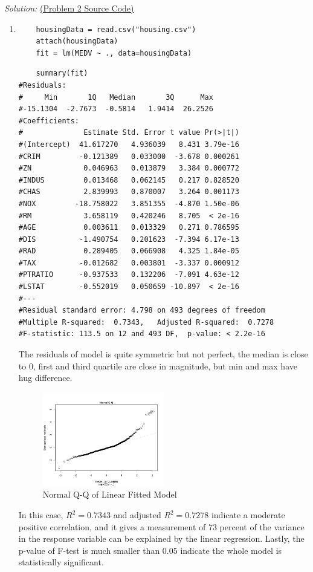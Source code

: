 \documentclass{article}
\newenvironment{solution}
    {\textit{Solution:}}
    {}
\begin{document}
\newpage
\begin{solution}
\href{run:./src/RCode/p2.r}{ (Problem 2 Source Code)}
	\begin{enumerate}
		\item\mbox{}
		\begin{lstlisting}
	housingData = read.csv("housing.csv")
	attach(housingData)
	fit = lm(MEDV ~ ., data=housingData)
		\end{lstlisting}
		\begin{lstlisting}
	summary(fit)
#Residuals:
#     Min       1Q   Median       3Q      Max 
#-15.1304  -2.7673  -0.5814   1.9414  26.2526 
#Coefficients:
#              Estimate Std. Error t value Pr(>|t|)    
#(Intercept)  41.617270   4.936039   8.431 3.79e-16 
#CRIM         -0.121389   0.033000  -3.678 0.000261 
#ZN            0.046963   0.013879   3.384 0.000772 
#INDUS         0.013468   0.062145   0.217 0.828520    
#CHAS          2.839993   0.870007   3.264 0.001173  
#NOX         -18.758022   3.851355  -4.870 1.50e-06 
#RM            3.658119   0.420246   8.705  < 2e-16 
#AGE           0.003611   0.013329   0.271 0.786595    
#DIS          -1.490754   0.201623  -7.394 6.17e-13 
#RAD           0.289405   0.066908   4.325 1.84e-05 
#TAX          -0.012682   0.003801  -3.337 0.000912 
#PTRATIO      -0.937533   0.132206  -7.091 4.63e-12 
#LSTAT        -0.552019   0.050659 -10.897  < 2e-16 
#---
#Residual standard error: 4.798 on 493 degrees of freedom
#Multiple R-squared:  0.7343,	Adjusted R-squared:  0.7278 
#F-statistic: 113.5 on 12 and 493 DF,  p-value: < 2.2e-16
		\end{lstlisting}
The residuals of model is quite symmetric but not perfect, the median is close to 0, first and third quartile are close in magnitude, but min and max have hug difference.
	\begin{figure}[h]
		\centering
		\includegraphics[width=0.5\textwidth]{figure7_Rplot.jpeg}
		\caption{Normal Q-Q of Linear Fitted Model}
	\end{figure}
\newpage
In this case, $R^2 = 0.7343$ and adjusted $R^2 = 0.7278$ indicate a moderate positive correlation, and it gives a measurement of 73 percent of the variance in the response variable can be explained by the linear regression. Lastly, the p-value of F-test is much smaller than 0.05 indicate the whole model is statistically significant.

\end{enumerate}
\end{solution}
\end{document}
